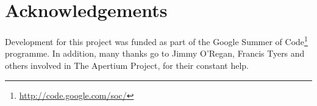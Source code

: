 \documentclass[11pt]{article}
\begin{document}
\section*{Acknowledgements}

Development for this project was funded as part of the Google Summer of Code\footnote{\url{http://code.google.com/soc/}} programme. 
In addition, many thanks go to Jimmy O'Regan, Francis Tyers and others involved in The Apertium Project, for their constant help.




\end{document}
